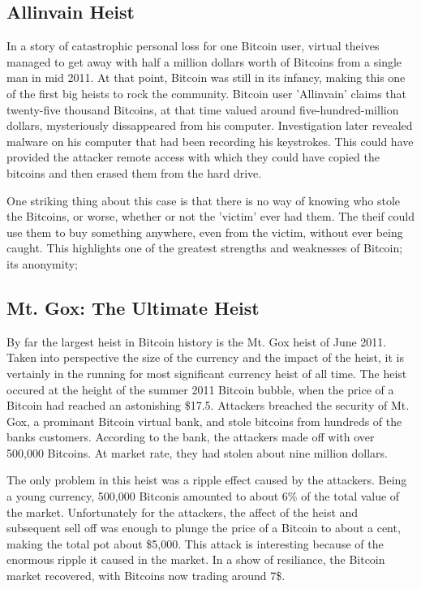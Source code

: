 \documentclass{report}
\begin{document}
\subsection*{Allinvain Heist}
In a story of catastrophic personal loss for one Bitcoin user, virtual theives managed 
to get away with half a million dollars worth of Bitcoins from a single man in mid 2011\cite{Worstoll:Allinvain}.
At that point, Bitcoin was still in its infancy, making this one of the first big heists 
to rock the community.  Bitcoin user 'Allinvain' claims that twenty-five thousand Bitcoins,
at that time valued around five-hundred-million dollars, mysteriously dissappeared from 
his computer.  Investigation later revealed malware on his computer that had been recording
his keystrokes.  This could have provided the attacker remote access with which they could
have copied the bitcoins and then erased them from the hard drive.

One striking thing about this case is that there is no way of knowing who stole the Bitcoins, 
or worse, whether or not the 'victim' ever had them.  The theif could use them to buy 
something anywhere, even from the victim, without ever being caught.  This highlights one 
of the greatest strengths and weaknesses of Bitcoin; its anonymity;

\subsection*{Mt. Gox: The Ultimate Heist}
By far the largest heist in Bitcoin history is the Mt. Gox heist of June 2011\cite{Rashid:MtGox}.  Taken into
perspective the size of the currency and the impact of the heist, it is vertainly in the
running for most significant currency heist of all time.  The heist occured at the height
of the summer 2011 Bitcoin bubble, when the price of a Bitcoin had reached an astonishing
\$17.5.  Attackers breached the security of Mt. Gox, a prominant Bitcoin virtual bank,
and stole bitcoins from hundreds of the banks customers.  According to the bank, the attackers
made off with over 500,000 Bitcoins.  At market rate, they had stolen about nine million
dollars.

The only problem in this heist was a ripple effect caused by the attackers.  Being a young
currency, 500,000 Bitconis amounted to about 6\% of the total value of the market.
Unfortunately for the attackers, the affect of the heist and subsequent sell off was enough
to plunge the price of a Bitcoin to about a cent, making the total pot about \$5,000.  This
attack is interesting because of the enormous ripple it caused in the market.  In a show of
resiliance, the Bitcoin market recovered, with Bitcoins now trading around 7\$.
\end{document}
